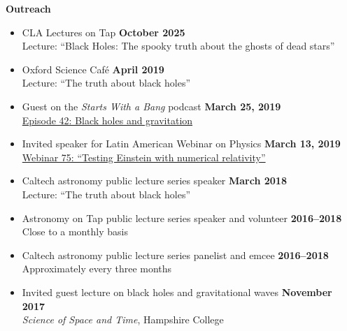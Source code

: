 \documentclass[margin,line]{res}
\begin{document}
\begin{resume}
{\bf Outreach}
\vspace*{.05in}
\begin{itemize}

\item[] CLA Lectures on Tap
  \hfill {\bf October 2025} \\
  \hspace*{1em} Lecture: ``Black Holes: The spooky truth about the ghosts of dead stars''

\item[] Oxford Science Café
  \hfill {\bf April 2019} \\
  \hspace*{1em} Lecture: ``The truth about black holes''

\item[] Guest on the {\it Starts With a Bang} podcast
  \hfill {\bf March 25, 2019} \\
  \hspace*{1em}
\href{https://soundcloud.com/ethan-siegel-172073460/starts-with-a-bang-42-black-holes-and-gravitation}{Episode 42: Black holes and gravitation}


\item[] Invited speaker for Latin American Webinar on Physics
  \hfill {\bf March 13, 2019} \\
  \hspace*{1em} \href{https://www.youtube.com/watch?v=7HO07-QtvMI}
  {Webinar 75: ``Testing Einstein with numerical relativity''}

\item[] Caltech astronomy public lecture series speaker
  \hfill {\bf March 2018} \\
  \hspace*{1em} Lecture: ``The truth about black holes''

\item[] Astronomy on Tap public lecture series speaker and volunteer
  \hfill {\bf 2016--2018} \\
\hspace*{1em} Close to a monthly basis

\item[] Caltech astronomy public lecture series panelist and emcee
        \hfill {\bf 2016--2018} \\
\hspace*{1em} Approximately every three months

\item[] Invited guest lecture on black holes and gravitational waves \hfill {\bf November 2017} \\
\hspace*{1em} {\it Science of Space and Time}, Hampshire College


\end{itemize}
\end{resume}
\end{document}
